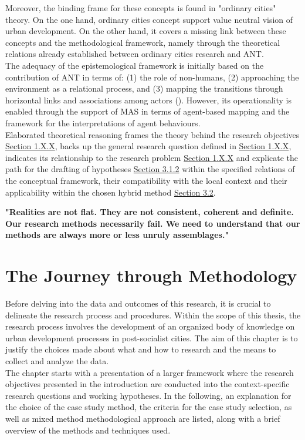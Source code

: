 \documentclass[11pt]{report}
\begin{document}
Moreover, the binding frame for these concepts is found in "ordinary cities" theory. On the one hand, ordinary cities concept support value neutral vision of urban development. On the other hand, it covers a missing link between these concepts and the methodological framework, namely through the theoretical relations already established between ordinary cities research and ANT.
\\

The adequacy of the epistemological framework is initially based on the contribution of ANT in terms of:
(1) the role of non-humans,
(2) approaching the environment as a relational process, and
(3) mapping the transitions through horizontal links and associations among actors (\cite{Latour 2005}).
However, its operationality is enabled through the support of MAS in terms of agent-based mapping and the framework for the interpretations of agent behaviours. 
\\

Elaborated theoretical reasoning frames the theory behind the research objectives \href{Section 1.X.X}{Section 1.X.X}, backs up the general research question defined in \href{Section 1.X.X}{Section 1.X.X}, indicates its relationship to the research problem \href{Section 1.X.X}{Section 1.X.X} and explicate the path for the drafting of hypotheses \href{Section 3.1.2}{Section 3.1.2} within the specified relations of the conceptual framework, their compatibility with the local context and their applicability within the chosen hybrid method \href{Section 3.2}{Section 3.2}.

\textbf{"Realities are not flat. They are not consistent, coherent and definite. Our research methods necessarily fail. We need to understand that our methods are always more or less unruly assemblages." \citealt{Law 2007}}



\chapter{The Journey through Methodology}

Before delving into the data  and outcomes of this research, it is crucial to delineate the research process and procedures. Within the scope of this thesis, the research process involves the development of an organized body of knowledge on urban development processes in post-socialist cities. The aim of this chapter is to justify the choices made about what and how to research and the means to collect and analyze the data.
\\
The chapter starts with a presentation of a larger framework where the research objectives presented in the introduction are conducted into the context-specific research questions and working hypotheses. In the following, an explanation for the choice of the case study method, the criteria for the case study selection, as well as mixed method methodological approach are listed, along with a brief overview of the methods and techniques used.  
\end{document}
